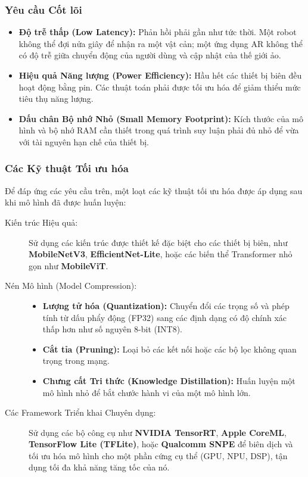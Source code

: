 \subsubsection{Yêu cầu Cốt lõi}
\label{subsubsec:edge_requirements}
\begin{itemize}
	\item \textbf{Độ trễ thấp (Low Latency):} Phản hồi phải gần như tức thời. Một robot không thể đợi nửa giây để nhận ra một vật cản; một ứng dụng AR không thể có độ trễ giữa chuyển động của người dùng và cập nhật của thế giới ảo.
	\item \textbf{Hiệu quả Năng lượng (Power Efficiency):} Hầu hết các thiết bị biên đều hoạt động bằng pin. Các thuật toán phải được tối ưu hóa để giảm thiểu mức tiêu thụ năng lượng.
	\item \textbf{Dấu chân Bộ nhớ Nhỏ (Small Memory Footprint):} Kích thước của mô hình và bộ nhớ RAM cần thiết trong quá trình suy luận phải đủ nhỏ để vừa với tài nguyên hạn chế của thiết bị.
\end{itemize}

\subsubsection{Các Kỹ thuật Tối ưu hóa}
\label{subsubsec:edge_optimization_techniques}
Để đáp ứng các yêu cầu trên, một loạt các kỹ thuật tối ưu hóa được áp dụng sau khi mô hình đã được huấn luyện:
\begin{description}
	\item[Kiến trúc Hiệu quả:] Sử dụng các kiến trúc được thiết kế đặc biệt cho các thiết bị biên, như \textbf{MobileNetV3}, \textbf{EfficientNet-Lite}, hoặc các biến thể Transformer nhỏ gọn như \textbf{MobileViT}.
	\item[Nén Mô hình (Model Compression):]
	\begin{itemize}
		\item \textbf{Lượng tử hóa (Quantization):} Chuyển đổi các trọng số và phép tính từ dấu phẩy động (FP32) sang các định dạng có độ chính xác thấp hơn như số nguyên 8-bit (INT8).
		\item \textbf{Cắt tỉa (Pruning):} Loại bỏ các kết nối hoặc các bộ lọc không quan trọng trong mạng.
		\item \textbf{Chưng cất Tri thức (Knowledge Distillation):} Huấn luyện một mô hình nhỏ để bắt chước hành vi của một mô hình lớn.
	\end{itemize}
	\item[Các Framework Triển khai Chuyên dụng:] Sử dụng các bộ công cụ như \textbf{NVIDIA TensorRT}, \textbf{Apple CoreML}, \textbf{TensorFlow Lite (TFLite)}, hoặc \textbf{Qualcomm SNPE} để biên dịch và tối ưu hóa mô hình cho một phần cứng cụ thể (GPU, NPU, DSP), tận dụng tối đa khả năng tăng tốc của nó.
\end{description}

